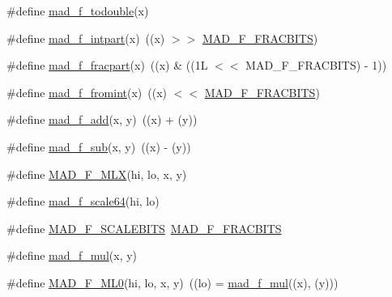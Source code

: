 \begin{DoxyCompactItemize}
\item 
\#define \hyperlink{lib-src_2libmad_2msvc_09_09_2mad_8h_ab89fbb463a905be3b71c39d148626d9c}{mad\+\_\+f\+\_\+todouble}(x)
\item 
\#define \hyperlink{lib-src_2libmad_2msvc_09_09_2mad_8h_aa850442e41ebbdf423afc558e02f26fc}{mad\+\_\+f\+\_\+intpart}(x)~((x) $>$$>$ \hyperlink{mac_2config_2i386_2lib-src_2libmad_2mad_8h_afe9f395501b4973ab536c13fb8235944}{M\+A\+D\+\_\+\+F\+\_\+\+F\+R\+A\+C\+B\+I\+TS})
\item 
\#define \hyperlink{lib-src_2libmad_2msvc_09_09_2mad_8h_adb451b6d7dd6c047fbdf93a2a95d1021}{mad\+\_\+f\+\_\+fracpart}(x)~((x) \& ((1\+L $<$$<$ M\+A\+D\+\_\+\+F\+\_\+\+F\+R\+A\+C\+B\+I\+T\+S) -\/ 1))
\item 
\#define \hyperlink{lib-src_2libmad_2msvc_09_09_2mad_8h_a4be984ff1bc37a93928705089668ee71}{mad\+\_\+f\+\_\+fromint}(x)~((x) $<$$<$ \hyperlink{mac_2config_2i386_2lib-src_2libmad_2mad_8h_afe9f395501b4973ab536c13fb8235944}{M\+A\+D\+\_\+\+F\+\_\+\+F\+R\+A\+C\+B\+I\+TS})
\item 
\#define \hyperlink{lib-src_2libmad_2msvc_09_09_2mad_8h_aa39dad203617307f6d641f797516d871}{mad\+\_\+f\+\_\+add}(x,  y)~((x) + (y))
\item 
\#define \hyperlink{lib-src_2libmad_2msvc_09_09_2mad_8h_a3836b9f2d266932db1192c4c5195298c}{mad\+\_\+f\+\_\+sub}(x,  y)~((x) -\/ (y))
\item 
\#define \hyperlink{lib-src_2libmad_2msvc_09_09_2mad_8h_a32e96014bff64372e6ddda6449d2862a}{M\+A\+D\+\_\+\+F\+\_\+\+M\+LX}(hi,  lo,  x,  y)
\item 
\#define \hyperlink{lib-src_2libmad_2msvc_09_09_2mad_8h_a836fb7fa861debac4b5fb4b1013ff309}{mad\+\_\+f\+\_\+scale64}(hi,  lo)
\item 
\#define \hyperlink{lib-src_2libmad_2msvc_09_09_2mad_8h_aa0356c356ceced040bed036d0b4a2b2e}{M\+A\+D\+\_\+\+F\+\_\+\+S\+C\+A\+L\+E\+B\+I\+TS}~\hyperlink{mac_2config_2i386_2lib-src_2libmad_2mad_8h_afe9f395501b4973ab536c13fb8235944}{M\+A\+D\+\_\+\+F\+\_\+\+F\+R\+A\+C\+B\+I\+TS}
\item 
\#define \hyperlink{lib-src_2libmad_2msvc_09_09_2mad_8h_ac424f0a810aae505036e63103f4a25af}{mad\+\_\+f\+\_\+mul}(x,  y)
\item 
\#define \hyperlink{lib-src_2libmad_2msvc_09_09_2mad_8h_ad700e5599dd11accc3128356e2d975e8}{M\+A\+D\+\_\+\+F\+\_\+\+M\+L0}(hi,  lo,  x,  y)~((lo)  = \hyperlink{mac_2config_2i386_2lib-src_2libmad_2mad_8h_ac424f0a810aae505036e63103f4a25af}{mad\+\_\+f\+\_\+mul}((x), (y)))
\item 
$$
\end{DoxyCompactItemize}
